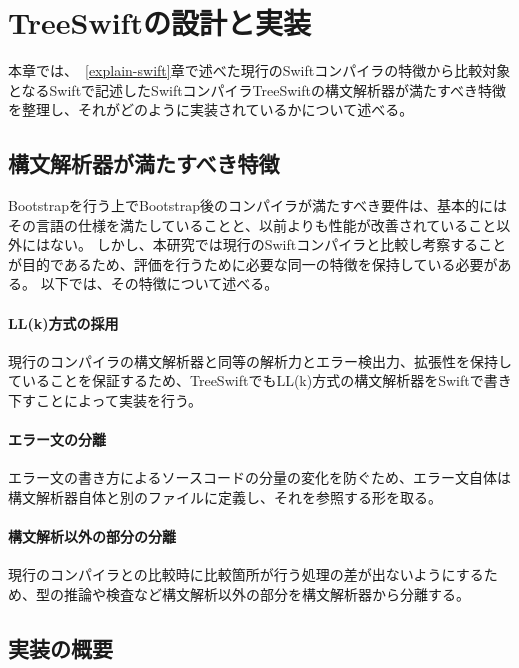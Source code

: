 \chapter{TreeSwiftの設計と実装}
\label{treeswift}

本章では、~\ref{explain-swift}章で述べた現行のSwiftコンパイラの特徴から比較対象となるSwiftで記述したSwiftコンパイラTreeSwiftの構文解析器が満たすべき特徴を整理し、それがどのように実装されているかについて述べる。

\section{構文解析器が満たすべき特徴}
\label{treeswift:requirements}

Bootstrapを行う上でBootstrap後のコンパイラが満たすべき要件は、基本的にはその言語の仕様を満たしていることと、以前よりも性能が改善されていること以外にはない。
しかし、本研究では現行のSwiftコンパイラと比較し考察することが目的であるため、評価を行うために必要な同一の特徴を保持している必要がある。
以下では、その特徴について述べる。

\subsubsection{LL(k)方式の採用}

現行のコンパイラの構文解析器と同等の解析力とエラー検出力、拡張性を保持していることを保証するため、TreeSwiftでもLL(k)方式の構文解析器をSwiftで書き下すことによって実装を行う。

\subsubsection{エラー文の分離}

エラー文の書き方によるソースコードの分量の変化を防ぐため、エラー文自体は構文解析器自体と別のファイルに定義し、それを参照する形を取る。

\subsubsection{構文解析以外の部分の分離}

現行のコンパイラとの比較時に比較箇所が行う処理の差が出ないようにするため、型の推論や検査など構文解析以外の部分を構文解析器から分離する。


\section{実装の概要}

